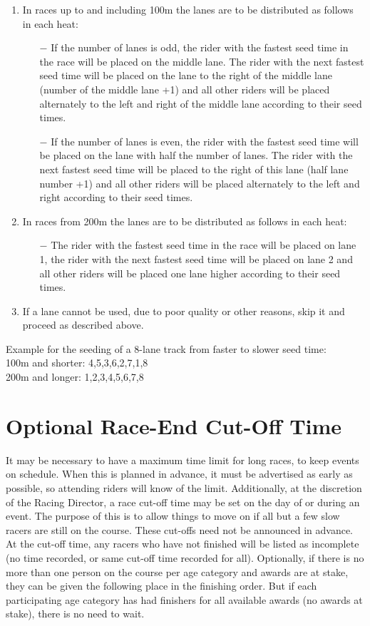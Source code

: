\begin{enumerate}
\item In races up to and including 100m the lanes are to be distributed as follows in each heat:
  \begin{itemize}
  \item[$-$] If the number of lanes is odd, the rider with the fastest seed time in the race will be placed on the middle lane.
  The rider with the next fastest seed time will be placed on the lane to the right of the middle lane (number of the middle lane +1) and all other riders will be placed alternately to the left and right of the middle lane according to their seed times.
  \item[$-$] If the number of lanes is even, the rider with the fastest seed time will be placed on the lane with half the number of lanes.
  The rider with the next fastest seed time will be placed to the right of this lane (half lane number +1) and all other riders will be placed alternately to the left and right according to their seed times.
  \end{itemize}
\item In races from 200m the lanes are to be distributed as follows in each heat:
  \begin{itemize}
  \item[$-$] The rider with the fastest seed time in the race will be placed on lane 1, the rider with the next fastest seed time will be placed on lane 2 and all other riders will be placed one lane higher according to their seed times.
  \end{itemize}
\item If a lane cannot be used, due to poor quality or other reasons, skip it and proceed as described above.
\end{enumerate}

Example for the seeding of a 8-lane track from faster to slower seed time:\\
100m and shorter: 4,5,3,6,2,7,1,8\\
200m and longer: 1,2,3,4,5,6,7,8

\section{Optional Race-End Cut-Off Time}
It may be necessary to have a maximum time limit for long races, to keep events on schedule.
When this is planned in advance, it must be advertised as early as possible, so attending riders will know of the limit.
Additionally, at the discretion of the Racing Director, a race cut-off time may be set on the day of or during an event.
The purpose of this is to allow things to move on if all but a few slow racers are still on the course.
These cut-offs need not be announced in advance.
At the cut-off time, any racers who have not finished will be listed as incomplete (no time recorded, or same cut-off time recorded for all).
Optionally, if there is no more than one person on the course per age category and awards are at stake, they can be given the following place in the finishing order.
But if each participating age category has had finishers for all available awards (no awards at stake), there is no need to wait.

